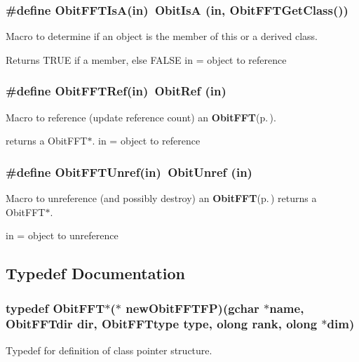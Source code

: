 \subsubsection{\setlength{\rightskip}{0pt plus 5cm}\#define Obit\-FFTIs\-A(in)\ Obit\-Is\-A (in, Obit\-FFTGet\-Class())}\label{ObitFFT_8h_a2}


Macro to determine if an object is the member of this or a derived class. 

Returns TRUE if a member, else FALSE in = object to reference 
\subsubsection{\setlength{\rightskip}{0pt plus 5cm}\#define Obit\-FFTRef(in)\ Obit\-Ref (in)}\label{ObitFFT_8h_a1}


Macro to reference (update reference count) an {\bf Obit\-FFT}{\rm (p.\,\pageref{structObitFFT})}. 

returns a Obit\-FFT$\ast$. in = object to reference 
\subsubsection{\setlength{\rightskip}{0pt plus 5cm}\#define Obit\-FFTUnref(in)\ Obit\-Unref (in)}\label{ObitFFT_8h_a0}


Macro to unreference (and possibly destroy) an {\bf Obit\-FFT}{\rm (p.\,\pageref{structObitFFT})} returns a Obit\-FFT$\ast$. 

in = object to unreference 

\subsection{Typedef Documentation}
\subsubsection{\setlength{\rightskip}{0pt plus 5cm}typedef {\bf Obit\-FFT}$\ast$($\ast$ {\bf new\-Obit\-FFTFP})(gchar $\ast$name, Obit\-FFTdir dir, Obit\-FFTtype type, {\bf olong} rank, {\bf olong} $\ast$dim)}\label{ObitFFT_8h_a3}


Typedef for definition of class pointer structure. 


